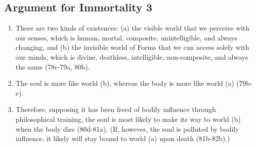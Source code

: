 \documentclass[oneside]{article}
\begin{document}
\subsection*{Argument for Immortality
3}\label{argument-for-immortality-3}

\begin{enumerate}
\def\labelenumi{\arabic{enumi}.}
\item
  There are two kinds of existences: (a) the visible world that we
  perceive with our senses, which is human, mortal, composite,
  unintelligible, and always changing, and (b) the invisible world of
  Forms that we can access solely with our minds, which is divine,
  deathless, intelligible, non-composite, and always the same (78c-79a,
  80b).
\item
  The soul is more like world (b), whereas the body is more like world
  (a) (79b-e).
\item
  Therefore, supposing it has been freed of bodily influence through
  philosophical training, the soul is most likely to make its way to
  world (b) when the body dies (80d-81a). (If, however, the soul is
  polluted by bodily influence, it likely will stay bound to world (a)
  upon death (81b-82b).)
\end{enumerate}
\end{document}
